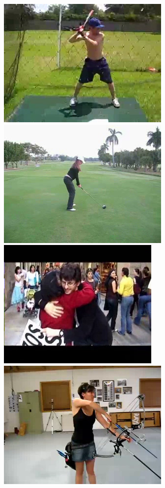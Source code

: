 \documentclass[10pt,twocolumn,letterpaper]{article}
\begin{document}
\begin{figure}[!t]
\begin{center}
\includegraphics[scale=0.19]{figures/dataset_thumb/hmdb/class2.png}
\includegraphics[scale=0.19]{figures/dataset_thumb/hmdb/class3.png} 
\includegraphics[scale=0.19]{figures/dataset_thumb/hmdb/class4.png} 
\includegraphics[scale=0.19]{figures/dataset_thumb/hmdb/class5.png} 

\end{center}
\end{figure}
\end{document}
